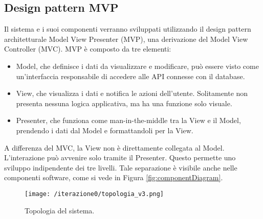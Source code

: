 \subsection{Design pattern MVP}
Il sistema e i suoi componenti verranno sviluppati utilizzando il design pattern architetturale Model View Presenter (MVP), una derivazione del Model View Controller (MVC). MVP è composto da tre elementi: \begin{itemize}
    \item Model, che definisce i dati da visualizzare e modificare, può essere visto come un'interfaccia responsabile di accedere alle API connesse con il database. 
    \item View, che visualizza i dati e notifica le azioni dell’utente. Solitamente non presenta nessuna logica applicativa, ma ha una funzione solo visuale. 
    \item Presenter, che funziona come man-in-the-middle tra la View e il Model, prendendo i dati dal Model e formattandoli per la View.
\end{itemize}
A differenza del MVC, la View non è direttamente collegata al Model. L'interazione può avvenire solo tramite il Presenter. Questo permette uno sviluppo indipendente dei tre livelli. Tale separazione è visibile anche nelle componenti software, come si vede in Figura \ref{fig:componentDiagram}.

\begin{figure}[htbp]
    \texttt{[image: /iterazione0/topologia\_v3.png]}
    \centering
    \caption{Topologia del sistema.}\label{fig:topologia}
\end{figure}